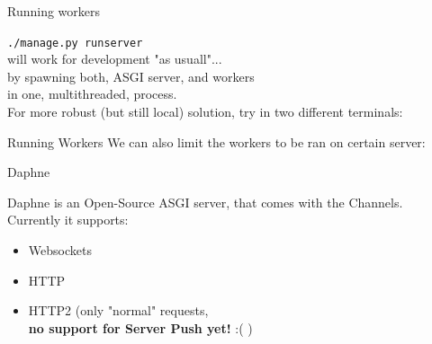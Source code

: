 \documentclass{beamer}
\begin{document}
\begin{frame}[fragile]{Running workers}
	\begin{center}
		\texttt{./manage.py runserver}\\
		will work for development "as usuall"...\\
		\pause
		by spawning both, ASGI server, and workers\\
		in one, multithreaded, process.\\
		\pause
		\vspace{1em}
		For more robust (but still local) solution, try in two different terminals:
	\end{center}
	
\end{frame}

\begin{frame}[fragile]{Running Workers}
We can also limit the workers to be ran on certain server:
\vspace{1em}
\end{frame}

\begin{frame}{Daphne}
\begin{center}
	Daphne is an Open-Source ASGI server, that comes with the Channels.\\
	\vspace{1em}
	Currently it supports:
	\begin{itemize}
		\item Websockets
		\item HTTP
		\item HTTP2 (only "normal" requests,\\ \textbf{no support for Server Push yet!} :( )
	\end{itemize}
\end{center}
\end{frame}
\end{document}

